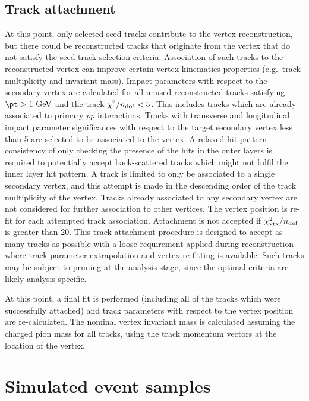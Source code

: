 \documentclass[PUB,UKenglish, texlive=2018]{\ATLASLATEXPATH atlasdoc}
\begin{document}
\subsection{Track attachment}
\label{sec:attachment}

At this point, only selected seed tracks contribute to the vertex reconstruction, but there could be reconstructed tracks that originate from the vertex that do not satisfy the seed track selection criteria.
Association of such tracks to the reconstructed vertex can improve certain vertex kinematics properties  (e.g.~track multiplicity and invariant mass).
Impact parameters with respect to the secondary vertex are calculated for all unused reconstructed tracks satisfying $\pt>1~{\rm GeV}$ and the track $\chi^{2}/n_{\rm dof}<5$. This includes tracks which are already associated to primary $pp$ interactions.
Tracks with transverse and longitudinal impact parameter significances with respect to the target secondary vertex less than 5 are selected to be associated to the vertex. 
A relaxed hit-pattern consistency of only checking the presence of the hits in the outer layers is required to potentially accept back-scattered tracks which might not fulfil the inner layer hit pattern. 
A track is limited to only be associated to a single secondary vertex, and this attempt is made in the descending order of the track multiplicity of the vertex. Tracks already associated to any secondary vertex are not considered for further association to other vertices. 
The vertex position is re-fit for each attempted track association. Attachment is not accepted if $\chi^{2}_{\rm vtx}/n_{\rm dof}$ is greater than 20. 
This track attachment procedure is designed to accept as many tracks as possible with a loose requirement applied during reconstruction where track parameter extrapolation and vertex re-fitting is available. 
Such tracks may be subject to pruning at the analysis stage, since the optimal criteria are likely analysis specific.

At this point, a final fit is performed (including all of the tracks which were successfully attached) and track parameters with respect to the vertex position are re-calculated. 
The nominal vertex invariant mass is calculated assuming the charged pion mass for all tracks, using the track momentum vectors at the location of the vertex.

\section{Simulated event samples \label{sec:Dataset} }
\end{document}
